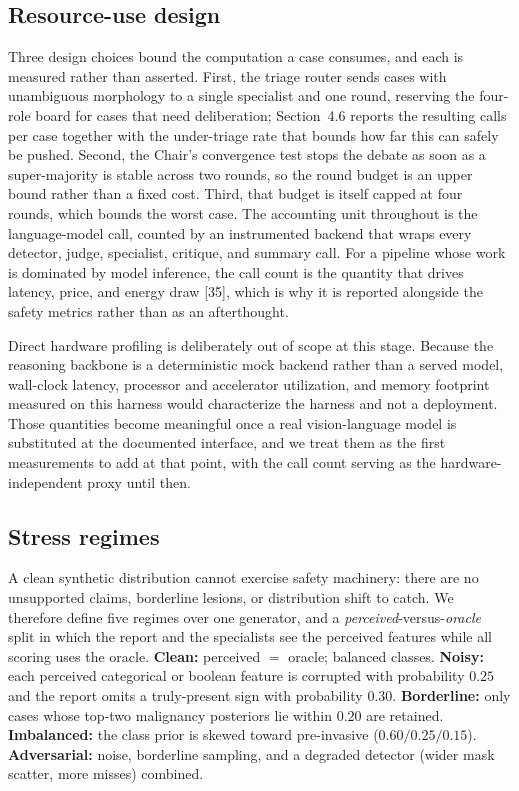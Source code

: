 \documentclass[12pt]{article}
\begin{document}
\subsection{Resource-use design}\label{sec:resource}

Three design choices bound the computation a case consumes, and each is measured rather than asserted. First, the triage router sends cases with unambiguous morphology to a single specialist and one round, reserving the four-role board for cases that need deliberation; Section~4.6 reports the resulting calls per case together with the under-triage rate that bounds how far this can safely be pushed. Second, the Chair's convergence test stops the debate as soon as a super-majority is stable across two rounds, so the round budget is an upper bound rather than a fixed cost. Third, that budget is itself capped at four rounds, which bounds the worst case. The accounting unit throughout is the language-model call, counted by an instrumented backend that wraps every detector, judge, specialist, critique, and summary call. For a pipeline whose work is dominated by model inference, the call count is the quantity that drives latency, price, and energy draw [35], which is why it is reported alongside the safety metrics rather than as an afterthought.


Direct hardware profiling is deliberately out of scope at this stage. Because the reasoning backbone is a deterministic mock backend rather than a served model, wall-clock latency, processor and accelerator utilization, and memory footprint measured on this harness would characterize the harness and not a deployment. Those quantities become meaningful once a real vision-language model is substituted at the documented interface, and we treat them as the first measurements to add at that point, with the call count serving as the hardware-independent proxy until then.

\subsection{Stress regimes}

A clean synthetic distribution cannot exercise safety machinery: there are no unsupported claims, borderline lesions, or distribution shift to catch. We therefore define five regimes over one generator, and a \emph{perceived}-versus-\emph{oracle} split in which the report and the specialists see the perceived features while all scoring uses the oracle. \textbf{Clean:} perceived $=$ oracle; balanced classes. \textbf{Noisy:} each perceived categorical or boolean feature is corrupted with probability $0.25$ and the report omits a truly-present sign with probability $0.30$. \textbf{Borderline:} only cases whose top-two malignancy posteriors lie within $0.20$ are retained. \textbf{Imbalanced:} the class prior is skewed toward pre-invasive ($0.60/0.25/0.15$). \textbf{Adversarial:} noise, borderline sampling, and a degraded detector (wider mask scatter, more misses) combined.
\end{document}
